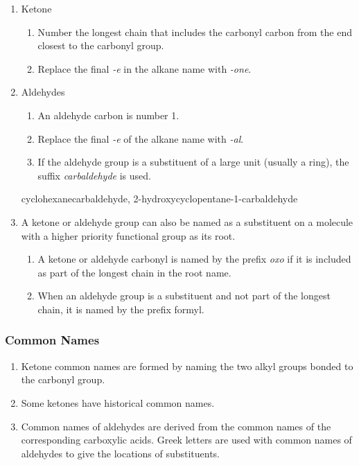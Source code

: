 \begin{enumerate}
    \item Ketone
    \begin{enumerate}
        \item Number the longest chain that includes the carbonyl carbon from the end closest to the carbonyl group.
        \item Replace the final \textit{-e} in the alkane name with \textit{-one}.
    \end{enumerate}
    \item Aldehydes
    \begin{enumerate}
        \item An aldehyde carbon is number 1.
        \item Replace the final \textit{-e} of the alkane name with \textit{-al}.
        \item If the aldehyde group is a substituent of a large unit (usually a ring), the suffix \textit{carbaldehyde} is used.
    \end{enumerate}
    cyclohexanecarbaldehyde, 2-hydroxycyclopentane-1-carbaldehyde %
    \item A ketone or aldehyde group can also be named as a substituent on a molecule with a higher priority functional group as its root.
    \begin{enumerate}
        \item A ketone or aldehyde carbonyl is named by the prefix \textit{oxo} if it is included as part of the longest chain in the root name.
        \item When an aldehyde group is a substituent and not part of the longest chain, it is named by the prefix formyl.
    \end{enumerate}
\end{enumerate}

\subsubsection{Common Names}

\begin{enumerate}
    \item Ketone common names are formed by naming the two alkyl groups bonded to the carbonyl group.
    \item Some ketones have historical common names.
    \item Common names of aldehydes are derived from the common names of the corresponding carboxylic acids. Greek letters are used with common names of aldehydes to give the locations of substituents. %
\end{enumerate}

